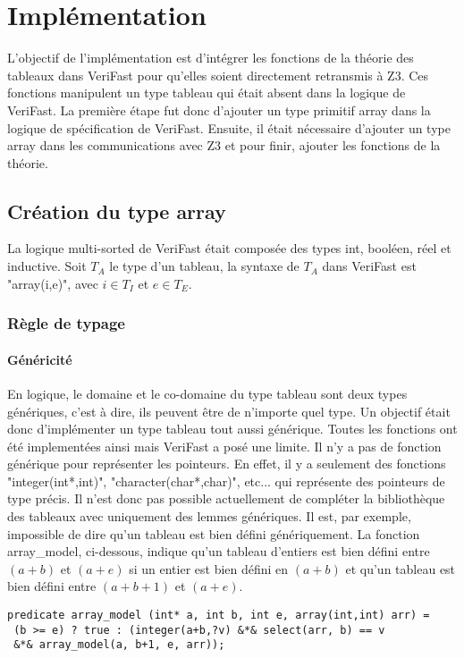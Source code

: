 \documentclass[9pt,openany]{book}
\newcommand{\verifast}{VeriFast}
\begin{document}
\chapter{Impl\'ementation}
	L'objectif de l'impl\'ementation est d'int\'egrer les fonctions de la th\'eorie des tableaux dans \verifast{} pour qu'elles soient directement retransmis \`a Z3. Ces fonctions manipulent un type tableau qui \'etait absent dans la logique de \verifast{}. La premi\`ere \'etape fut donc d'ajouter un type primitif array dans la logique de sp\'ecification de \verifast{}. Ensuite, il \'etait n\'ecessaire d'ajouter un type array dans les communications avec Z3 et pour finir, ajouter les fonctions de la th\'eorie.
	\section{Cr\'eation du type array}
		La logique multi-sorted de \verifast{} \'etait compos\'ee des types int, bool\'een, r\'eel et inductive. 
		Soit $T_{A}$ le type d'un tableau, la syntaxe de $T_{A}$ dans \verifast{} est "array(i,e)", avec $i\in T_I$ et $e\in T_E$.
		\subsection{R\`egle de typage}
			\subsubsection{G\'en\'ericit\'e}
			En logique, le domaine et le co-domaine du type tableau sont deux types g\'en\'eriques, c'est \`a dire, ils peuvent \^etre de n'importe quel type. Un objectif \'etait donc d'impl\'ementer un type tableau tout aussi g\'en\'erique. Toutes les fonctions ont \'et\'e implement\'ees ainsi mais \verifast{} a pos\'e une limite. Il n'y a pas de fonction g\'en\'erique pour repr\'esenter les pointeurs. En effet, il y a seulement des fonctions "integer(int*,int)", "character(char*,char)", etc... qui repr\'esente des pointeurs de type pr\'ecis. Il n'est donc pas possible actuellement de compl\'eter la biblioth\`eque des tableaux avec uniquement des lemmes g\'en\'eriques. Il est, par exemple, impossible de dire qu'un tableau est bien d\'efini g\'en\'eriquement. La fonction array\_model, ci-dessous, indique qu'un tableau d'entiers est bien d\'efini entre $(a+b)$ et $(a+e)$ si un entier est bien d\'efini en $(a+b)$ et qu'un tableau est bien d\'efini entre $(a+b+1)$ et $(a+e)$.
\begin{lstlisting}
predicate array_model (int* a, int b, int e, array(int,int) arr) =
 (b >= e) ? true : (integer(a+b,?v) &*& select(arr, b) == v
 &*& array_model(a, b+1, e, arr));
\end{lstlisting}
\end{document}
